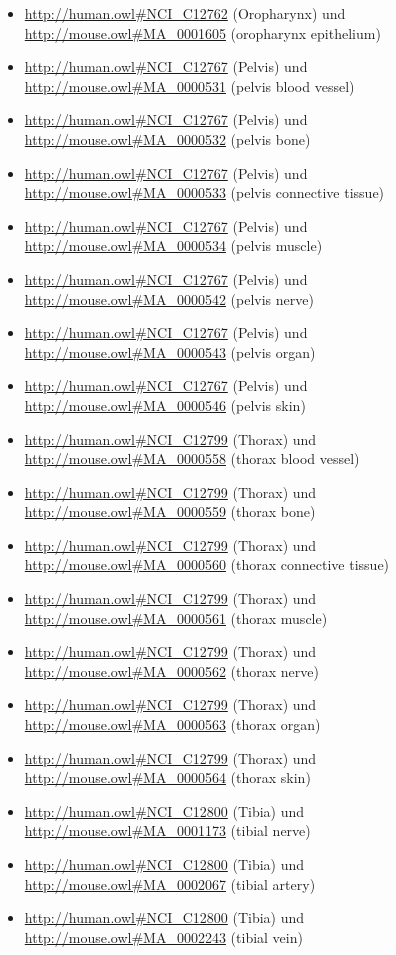 \begin{itemize}
	\item \url{http://human.owl#NCI_C12762} (Oropharynx) und \url{http://mouse.owl#MA_0001605} (oropharynx epithelium)
	\item \url{http://human.owl#NCI_C12767} (Pelvis) und \url{http://mouse.owl#MA_0000531} (pelvis blood vessel)
	\item \url{http://human.owl#NCI_C12767} (Pelvis) und \url{http://mouse.owl#MA_0000532} (pelvis bone)
	\item \url{http://human.owl#NCI_C12767} (Pelvis) und \url{http://mouse.owl#MA_0000533} (pelvis connective tissue)
	\item \url{http://human.owl#NCI_C12767} (Pelvis) und \url{http://mouse.owl#MA_0000534} (pelvis muscle)
	\item \url{http://human.owl#NCI_C12767} (Pelvis) und \url{http://mouse.owl#MA_0000542} (pelvis nerve)
	\item \url{http://human.owl#NCI_C12767} (Pelvis) und \url{http://mouse.owl#MA_0000543} (pelvis organ)
	\item \url{http://human.owl#NCI_C12767} (Pelvis) und \url{http://mouse.owl#MA_0000546} (pelvis skin)
	\item \url{http://human.owl#NCI_C12799} (Thorax) und \url{http://mouse.owl#MA_0000558} (thorax blood vessel)
	\item \url{http://human.owl#NCI_C12799} (Thorax) und \url{http://mouse.owl#MA_0000559} (thorax bone)
	\item \url{http://human.owl#NCI_C12799} (Thorax) und \url{http://mouse.owl#MA_0000560} (thorax connective tissue)
	\item \url{http://human.owl#NCI_C12799} (Thorax) und \url{http://mouse.owl#MA_0000561} (thorax muscle)
	\item \url{http://human.owl#NCI_C12799} (Thorax) und \url{http://mouse.owl#MA_0000562} (thorax nerve)
	\item \url{http://human.owl#NCI_C12799} (Thorax) und \url{http://mouse.owl#MA_0000563} (thorax organ)
	\item \url{http://human.owl#NCI_C12799} (Thorax) und \url{http://mouse.owl#MA_0000564} (thorax skin)
	\item \url{http://human.owl#NCI_C12800} (Tibia) und \url{http://mouse.owl#MA_0001173} (tibial nerve)
	\item \url{http://human.owl#NCI_C12800} (Tibia) und \url{http://mouse.owl#MA_0002067} (tibial artery)
	\item \url{http://human.owl#NCI_C12800} (Tibia) und \url{http://mouse.owl#MA_0002243} (tibial vein)

\end{itemize}
